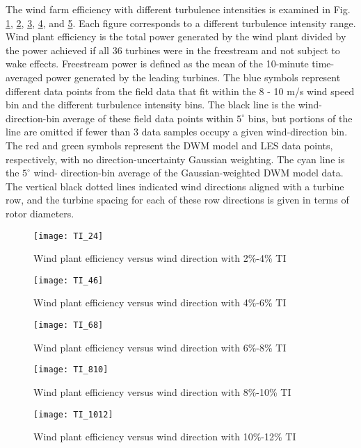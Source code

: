\documentclass{umthesis}
\begin{document}
The wind farm efficiency with different turbulence intensities is examined in Fig. \ref{fig:TI_24}, \ref{fig:TI_46}, \ref{fig:TI_68}, \ref{fig:TI_810}, and \ref{fig:TI_1012}. Each figure corresponds to a different turbulence intensity range. Wind plant efficiency is the total power generated by the wind plant divided by the power achieved if all 36 turbines were in the freestream and not subject to wake effects. Freestream power is defined as the mean of the 10-minute time-averaged power generated by the leading turbines. The blue symbols represent different data points from the field data that fit within the 8 - 10 m/s wind speed bin and the different turbulence intensity bins. The black line is the wind-direction-bin average of these field data points within $5^\circ$ bins, but portions of the line are omitted if fewer than 3 data samples occupy a given wind-direction bin. The red and green symbols represent the DWM model and LES data points, respectively, with no direction-uncertainty Gaussian weighting. The cyan line is the $5^\circ$ wind- direction-bin average of the Gaussian-weighted DWM model data. The vertical black dotted lines indicated wind directions aligned with a turbine row, and the turbine spacing for each of these row directions is given in terms of rotor diameters.

\begin{figure}
  \centering
  \texttt{[image: TI\_24]}
  \caption{Wind plant efficiency versus wind direction with 2\%-4\% TI}\label{fig:TI_24}
\end{figure}

\begin{figure}
  \centering
  \texttt{[image: TI\_46]}
  \caption{Wind plant efficiency versus wind direction with 4\%-6\% TI}\label{fig:TI_46}
\end{figure}

\begin{figure}
  \centering
  \texttt{[image: TI\_68]}
  \caption{Wind plant efficiency versus wind direction with 6\%-8\% TI}\label{fig:TI_68}
\end{figure}

\begin{figure}
  \centering
  \texttt{[image: TI\_810]}
  \caption{Wind plant efficiency versus wind direction with 8\%-10\% TI}\label{fig:TI_810}
\end{figure}

\begin{figure}
  \centering
  \texttt{[image: TI\_1012]}
  \caption{Wind plant efficiency versus wind direction with 10\%-12\% TI}\label{fig:TI_1012}
\end{figure}
\end{document}
